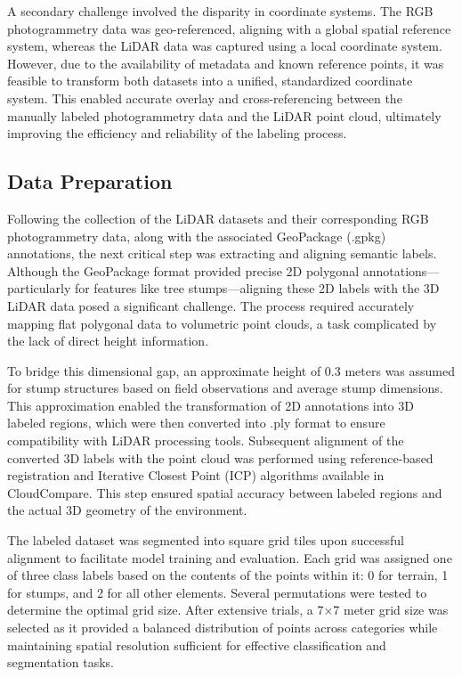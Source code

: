 \documentclass[../report.tex]{subfiles}
\begin{document}
    A secondary challenge involved the disparity in coordinate systems. The RGB photogrammetry data was geo-referenced, aligning with a global spatial reference system, whereas the LiDAR data was captured using a local coordinate system. However, due to the availability of metadata and known reference points, it was feasible to transform both datasets into a unified, standardized coordinate system. This enabled accurate overlay and cross-referencing between the manually labeled photogrammetry data and the LiDAR point cloud, ultimately improving the efficiency and reliability of the labeling process.
    
	\subsection{Data Preparation}
    Following the collection of the LiDAR datasets and their corresponding RGB photogrammetry data, along with the associated GeoPackage (.gpkg) annotations, the next critical step was extracting and aligning semantic labels. Although the GeoPackage format provided precise 2D polygonal annotations—particularly for features like tree stumps—aligning these 2D labels with the 3D LiDAR data posed a significant challenge. The process required accurately mapping flat polygonal data to volumetric point clouds, a task complicated by the lack of direct height information.

    To bridge this dimensional gap, an approximate height of 0.3 meters was assumed for stump structures based on field observations and average stump dimensions. This approximation enabled the transformation of 2D annotations into 3D labeled regions, which were then converted into .ply format to ensure compatibility with LiDAR processing tools. Subsequent alignment of the converted 3D labels with the point cloud was performed using reference-based registration and Iterative Closest Point (ICP) algorithms available in CloudCompare. This step ensured spatial accuracy between labeled regions and the actual 3D geometry of the environment.
    
    The labeled dataset was segmented into square grid tiles upon successful alignment to facilitate model training and evaluation. Each grid was assigned one of three class labels based on the contents of the points within it: 0 for terrain, 1 for stumps, and 2 for all other elements. Several permutations were tested to determine the optimal grid size. After extensive trials, a 7×7 meter grid size was selected as it provided a balanced distribution of points across categories while maintaining spatial resolution sufficient for effective classification and segmentation tasks.
    
\end{document}
